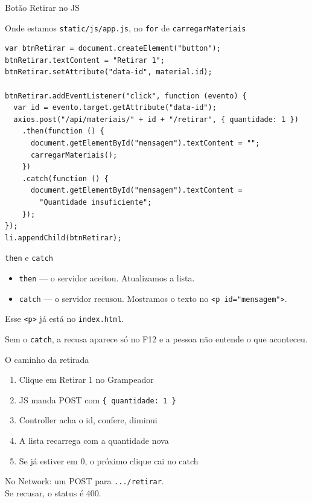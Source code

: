 \documentclass[aspectratio=169,11pt]{beamer}
\newcommand{\onde}[1]{%
  \begin{block}{Onde estamos}
    #1
  \end{block}
}
\begin{document}
\begin{frame}[fragile]{Botão Retirar no JS}
  \onde{\texttt{static/js/app.js}, no \texttt{for} de
        \texttt{carregarMateriais}}

\begin{lstlisting}[basicstyle=\ttfamily\scriptsize]
var btnRetirar = document.createElement("button");
btnRetirar.textContent = "Retirar 1";
btnRetirar.setAttribute("data-id", material.id);

btnRetirar.addEventListener("click", function (evento) {
  var id = evento.target.getAttribute("data-id");
  axios.post("/api/materiais/" + id + "/retirar", { quantidade: 1 })
    .then(function () {
      document.getElementById("mensagem").textContent = "";
      carregarMateriais();
    })
    .catch(function () {
      document.getElementById("mensagem").textContent =
        "Quantidade insuficiente";
    });
});
li.appendChild(btnRetirar);
\end{lstlisting}
\end{frame}

\begin{frame}{\texttt{then} e \texttt{catch}}
  \begin{itemize}
    \item \texttt{then} --- o servidor aceitou. Atualizamos a lista.
    \item \texttt{catch} --- o servidor recusou. Mostramos o texto
          no \texttt{<p id="mensagem">}.
  \end{itemize}

  \vspace{0.6em}
  Esse \texttt{<p>} já está no \texttt{index.html}.

  \vspace{0.5em}
  Sem o \texttt{catch}, a recusa aparece só no F12
  e a pessoa não entende o que aconteceu.
\end{frame}

\begin{frame}{O caminho da retirada}
  \begin{enumerate}
    \item Clique em Retirar 1 no Grampeador
    \item JS manda POST com \texttt{\{ quantidade: 1 \}}
    \item Controller acha o id, confere, diminui
    \item A lista recarrega com a quantidade nova
    \item Se já estiver em 0, o próximo clique cai no catch
  \end{enumerate}

  \vspace{0.5em}
  No Network: um POST para \texttt{.../retirar}.\\
  Se recusar, o status é 400.
\end{frame}
\end{document}
